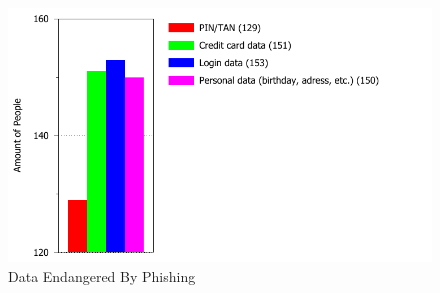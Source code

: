 \begin{figure}[hHtbp]
\includegraphics[width=1.0\textwidth]{graphix/402_Endangered_Data.pdf}%
\caption{Data Endangered By Phishing}%
\label{fig:endangered_data}%
\end{figure}
